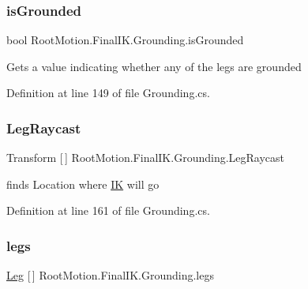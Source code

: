 \subsubsection{\texorpdfstring{is\+Grounded}{isGrounded}}
{\footnotesize\ttfamily bool Root\+Motion.\+Final\+I\+K.\+Grounding.\+is\+Grounded\hspace{0.3cm}{\ttfamily [get]}}



Gets a value indicating whether any of the legs are grounded 



Definition at line 149 of file Grounding.\+cs.

\mbox{\label{class_root_motion_1_1_final_i_k_1_1_grounding_a2f92e86bf0ae14cf4eb53cabc6b114e1}} 
\subsubsection{\texorpdfstring{Leg\+Raycast}{LegRaycast}}
{\footnotesize\ttfamily Transform \mbox{[}$\,$\mbox{]} Root\+Motion.\+Final\+I\+K.\+Grounding.\+Leg\+Raycast\hspace{0.3cm}{\ttfamily [get]}}



finds Location where \mbox{\hyperlink{class_root_motion_1_1_final_i_k_1_1_i_k}{IK}} will go 



Definition at line 161 of file Grounding.\+cs.

\mbox{\label{class_root_motion_1_1_final_i_k_1_1_grounding_a5094343c180bdd488e9b9b407bf8953f}} 
\subsubsection{\texorpdfstring{legs}{legs}}
{\footnotesize\ttfamily \mbox{\hyperlink{class_root_motion_1_1_final_i_k_1_1_grounding_1_1_leg}{Leg}} \mbox{[}$\,$\mbox{]} Root\+Motion.\+Final\+I\+K.\+Grounding.\+legs\hspace{0.3cm}{\ttfamily [get]}}




